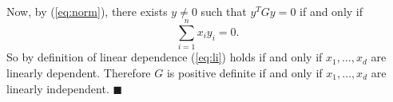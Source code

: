 \documentclass[letterpaper,12pt,oneside,onecolumn]{article}
\begin{document}
\paragraph{}
Now, by (\ref{eq:norm}), there exists $y\neq 0$ such that $y^TGy = 0$ if and only if
\begin{equation}\sum_{i=1}^n x_i y_i = 0. \label{eq:li}\end{equation}
So by definition of linear dependence  (\ref{eq:li}) holds if and only if $x_1, \dots, x_d$ are linearly dependent. Therefore $G$ is positive definite if and only if $x_1, \dots, x_d$ are linearly independent. $\blacksquare$
\end{document}

